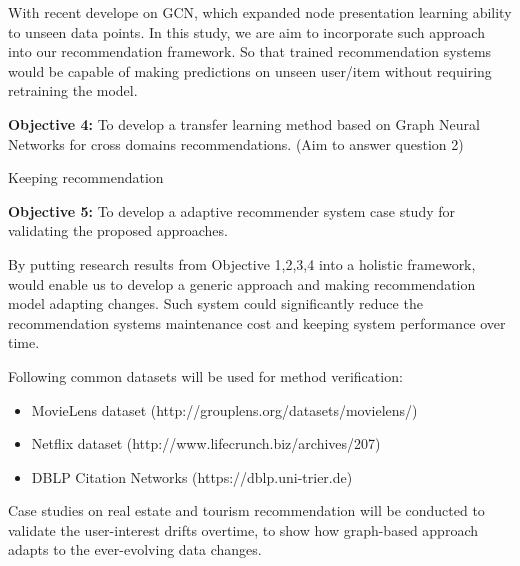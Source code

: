 With recent develope on GCN, which expanded node presentation learning ability to unseen data points. In this study, we are aim to incorporate such approach into our recommendation framework. So that trained recommendation systems would be capable of making predictions on unseen user/item without requiring retraining the model.

\bigskip
\textbf{Objective 4:} To develop a transfer learning method based on Graph Neural Networks for cross domains recommendations. (Aim to answer question 2)

Keeping recommendation


\bigskip
\textbf{Objective 5:} To develop a adaptive recommender system case study for validating the proposed approaches.

By putting research results from Objective 1,2,3,4 into a holistic framework, would enable us to develop a generic approach and making recommendation model adapting changes. Such system could significantly reduce the recommendation systems maintenance cost and keeping system performance over time. 

Following common datasets will be used for method verification: 

\begin{itemize}

\item MovieLens dataset (http://grouplens.org/datasets/movielens/) 

\item Netflix dataset (http://www.lifecrunch.biz/archives/207) 

\item DBLP Citation Networks (https://dblp.uni-trier.de)  

\end{itemize}

Case studies on real estate and tourism recommendation will be conducted to validate the user-interest drifts overtime, to show how graph-based approach adapts to the ever-evolving data changes. 
